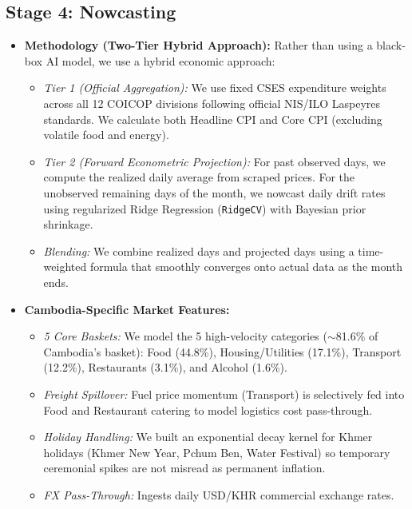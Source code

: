 \documentclass[10pt,a4paper]{article}
\begin{document}
\subsection*{Stage 4: Nowcasting}
\begin{itemize}[noitemsep,topsep=1pt,leftmargin=*]
    \item \textbf{Methodology (Two-Tier Hybrid Approach):} Rather than using a black-box AI model, we use a hybrid economic approach:
    \begin{itemize}[noitemsep]
        \item \textit{Tier 1 (Official Aggregation):} We use fixed CSES expenditure weights across all 12 COICOP divisions following official NIS/ILO Laspeyres standards. We calculate both Headline CPI and Core CPI (excluding volatile food and energy).
        \item \textit{Tier 2 (Forward Econometric Projection):} For past observed days, we compute the realized daily average from scraped prices. For the unobserved remaining days of the month, we nowcast daily drift rates using regularized Ridge Regression (\texttt{RidgeCV}) with Bayesian prior shrinkage.
        \item \textit{Blending:} We combine realized days and projected days using a time-weighted formula that smoothly converges onto actual data as the month ends.
    \end{itemize}
    \item \textbf{Cambodia-Specific Market Features:}
    \begin{itemize}[noitemsep]
        \item \textit{5 Core Baskets:} We model the 5 high-velocity categories ($\sim$81.6\% of Cambodia's basket): Food (44.8\%), Housing/Utilities (17.1\%), Transport (12.2\%), Restaurants (3.1\%), and Alcohol (1.6\%).
        \item \textit{Freight Spillover:} Fuel price momentum (Transport) is selectively fed into Food and Restaurant catering to model logistics cost pass-through.
        \item \textit{Holiday Handling:} We built an exponential decay kernel for Khmer holidays (Khmer New Year, Pchum Ben, Water Festival) so temporary ceremonial spikes are not misread as permanent inflation.
        \item \textit{FX Pass-Through:} Ingests daily USD/KHR commercial exchange rates.
    \end{itemize}
\end{itemize}
\end{document}
